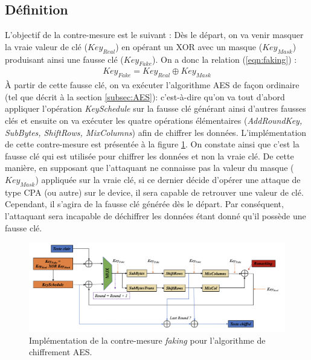 \documentclass[oneside]{book}
\begin{document}
\subsection{Définition}
\label{subsec:def}

\hspace{-0.5 cm}L'objectif de la contre-mesure est le suivant : Dès le départ, on va venir masquer la vraie valeur de clé ($Key_{Real}$) en opérant un XOR avec un masque ($Key_{Mask}$) produisant ainsi une fausse clé ($Key_{Fake}$). On a donc la relation (\ref{eqn:faking}) : 
\begin{gather}
	Key_{Fake} = Key_{Real} \oplus Key_{Mask}\label{eqn:faking}
\end{gather}
À partir de cette fausse clé, on va exécuter l'algorithme AES de façon ordinaire (tel que décrit à la section \ref{subsec:AES}): c'est-à-dire qu'on va tout d'abord appliquer l'opération \textit{KeySchedule} sur la fausse clé générant ainsi d'autres fausses clés et ensuite on va exécuter les quatre opérations élémentaires (\textit{AddRoundKey, SubBytes, ShiftRows, MixColumns}) afin de chiffrer les données. L'implémentation de cette contre-mesure est présentée à la figure \ref{fig:ConceptFaking}. On constate ainsi que c'est la fausse clé qui est utilisée pour chiffrer les données et non la vraie clé. De cette manière, en supposant que l'attaquant ne connaisse pas la valeur du masque ($Key_{Mask}$) appliquée sur la vraie clé, si ce dernier décide d'opérer une attaque de type CPA (ou autre) sur le device, il sera capable de retrouver une valeur de clé. Cependant, il s'agira de la fausse clé générée dès le départ. Par conséquent, l'attaquant sera incapable de déchiffrer les données étant donné qu'il possède une fausse clé. \\

\begin{figure}[htbp]
    \hspace{-1.4cm}
    \includegraphics[scale=0.52]{image/ConceptFaking}
    \caption{Implémentation de la contre-mesure \textit{faking} pour l'algorithme de chiffrement AES.}
    \label{fig:ConceptFaking} 
\end{figure}
\end{document}
